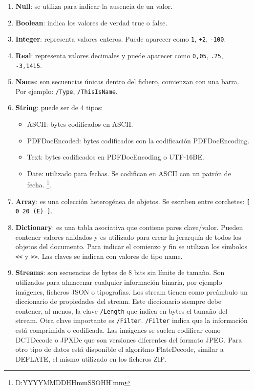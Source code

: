 \begin{enumerate}
    \item \textbf{Null}: se utiliza para indicar la ausencia de un valor.
    \item \textbf{Boolean}: indica los valores de verdad true o false.
    \item \textbf{Integer}: representa valores enteros. Puede aparecer como \verb|1|, \verb|+2|, \verb|-100|.
    \item \textbf{Real}: representa valores decimales y puede aparecer como \verb|0,05|, \verb|.25|, \verb|-3,1415|.
    \item \textbf{Name}: son secuencias únicas dentro del fichero, comienzan con una barra. Por ejemplo: \verb|/Type|, \verb|/ThisIsName|.
    \item \textbf{String}: puede ser de 4 tipos:
    \begin{itemize}
        \item ASCII: bytes codificados en ASCII.
        \item PDFDocEncoded: bytes codificados con la codificación PDFDocEncoding.
        \item Text: bytes codificados en PDFDocEncoding o UTF-16BE.
        \item Date: utilizado para fechas. Se codifican en ASCII con un patrón de fecha. \footnote{D:YYYYMMDDHHmmSSOHH’mm}.
    \end{itemize}
    \item \textbf{Array}: es una colección heterogénea de objetos. Se escriben entre corchetes: \verb|[ 0 20 (E) ]|.
    \item \textbf{Dictionary}: es una tabla asociativa que contiene pares clave/valor. Pueden contener valores anidados y es utilizado para crear la jerarquía de todos los objetos del documento. Para indicar el comienzo y fin se utilizan los símbolos \verb|<<| y \verb|>>|. Las claves se indican con valores de tipo name.
    \item \textbf{Streams}: son secuencias de bytes de 8 bits sin límite de tamaño. Son utilizados para almacenar cualquier información binaria, por ejemplo imágenes, ficheros JSON o tipografías. Los stream tienen como preámbulo un diccionario de propiedades del stream. Este diccionario siempre debe contener, al menos, la clave \verb|/Length| que indica en bytes el tamaño del stream. Otra clave importante es \verb|/Filter|. \verb|/Filter| indica que la información está comprimida o codificada. Las imágenes se suelen codificar como DCTDecode o JPXDe que son versiones diferentes del formato JPEG. Para otro tipo de datos está disponible el algoritmo FlateDecode, similar a  DEFLATE, el mismo utilizado en los ficheros ZIP.
\end{enumerate}

